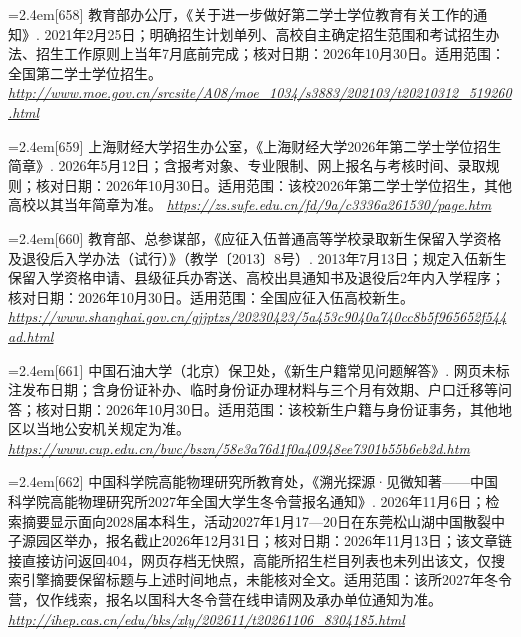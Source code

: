 \par\noindent\hangindent=2.4em\label{src:S0804}{\color{cAccent}[658]} 教育部办公厅，《关于进一步做好第二学士学位教育有关工作的通知》. 2021年2月25日；明确招生计划单列、高校自主确定招生范围和考试招生办法、招生工作原则上当年7月底前完成；核对日期：2026年10月30日。适用范围：全国第二学士学位招生。 \textit{\url{http://www.moe.gov.cn/srcsite/A08/moe_1034/s3883/202103/t20210312_519260.html}}\par
\par\noindent\hangindent=2.4em\label{src:S0805}{\color{cAccent}[659]} 上海财经大学招生办公室，《上海财经大学2026年第二学士学位招生简章》. 2026年5月12日；含报考对象、专业限制、网上报名与考核时间、录取规则；核对日期：2026年10月30日。适用范围：该校2026年第二学士学位招生，其他高校以其当年简章为准。 \textit{\url{https://zs.sufe.edu.cn/fd/9a/c3336a261530/page.htm}}\par
\par\noindent\hangindent=2.4em\label{src:S0806}{\color{cAccent}[660]} 教育部、总参谋部，《应征入伍普通高等学校录取新生保留入学资格及退役后入学办法（试行）》（教学〔2013〕8号）. 2013年7月13日；规定入伍新生保留入学资格申请、县级征兵办寄送、高校出具通知书及退役后2年内入学程序；核对日期：2026年10月30日。适用范围：全国应征入伍高校新生。 \textit{\url{https://www.shanghai.gov.cn/gjjptzs/20230423/5a453c9040a740cc8b5f965652f544ad.html}}\par
\par\noindent\hangindent=2.4em\label{src:S0807}{\color{cAccent}[661]} 中国石油大学（北京）保卫处，《新生户籍常见问题解答》. 网页未标注发布日期；含身份证补办、临时身份证办理材料与三个月有效期、户口迁移等问答；核对日期：2026年10月30日。适用范围：该校新生户籍与身份证事务，其他地区以当地公安机关规定为准。 \textit{\url{https://www.cup.edu.cn/bwc/bszn/58e3a76d1f0a40948ee7301b55b6eb2d.htm}}\par
\par\noindent\hangindent=2.4em\label{src:S0808}{\color{cAccent}[662]} 中国科学院高能物理研究所教育处，《溯光探源·见微知著——中国科学院高能物理研究所2027年全国大学生冬令营报名通知》. 2026年11月6日；检索摘要显示面向2028届本科生，活动2027年1月17—20日在东莞松山湖中国散裂中子源园区举办，报名截止2026年12月31日；核对日期：2026年11月13日；该文章链接直接访问返回404，网页存档无快照，高能所招生栏目列表也未列出该文，仅搜索引擎摘要保留标题与上述时间地点，未能核对全文。适用范围：该所2027年冬令营，仅作线索，报名以国科大冬令营在线申请网及承办单位通知为准。 \textit{\url{http://ihep.cas.cn/edu/bks/xly/202611/t20261106_8304185.html}}\par
